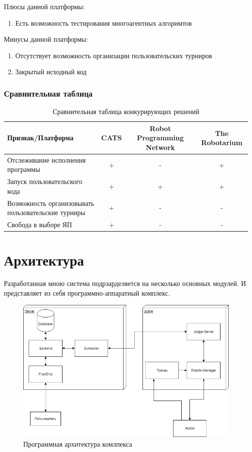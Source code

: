 \documentclass[a4paper,12pt]{article}
\begin{document}
Плюсы данной платформы:
\begin{enumerate}
    \item Есть возможность тестирования многоагентных алгоримтов
\end{enumerate}

Минусы данной платформы:
\begin{enumerate}
    \item Отсутствует возможность организации пользовательских турниров
    \item Закрытый исходный код
\end{enumerate}

\subsubsection{Сравнительная таблица}
\begin{table}[H]
    \begin{tabular}{|p{5cm}|c|c|c|}
    \hline
    Признак/Платформа & CATS & Robot Programming Network & The Robotarium \\
    \hline
    Отслеживание исполнения программы & + & - & + \\
    \hline
    Запуск пользовательского кода & + & + & + \\
    \hline
    Возможность организовывать пользовательские турниры & + & - & - \\
    \hline
    Свобода в выборе ЯП & + & - & - \\
    \hline
    \end{tabular}
    \caption{Сравнительная таблица конкурирующих решений}
    \label{tab:my_label}
\end{table}

\section{Архитектура}
Разработанная мною система подрзарделяется на несколько основных модулей. И представляет из себя программно-аппаратный комплекс. 

\begin{figure}[H]
    \includegraphics[width=\textwidth]{pictures/Architecture.png}
    \caption{Программная архитектура комлпекса}
    \label{fig:arch_diagram}
\end{figure}
\end{document}
